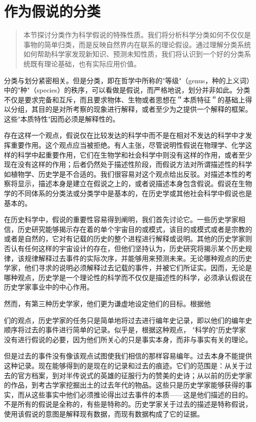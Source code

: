 \section{作为假说的分类}

\begin{quotation}
本节探讨分类作为科学假说的特殊性质。我们将分析科学分类如何不仅仅是事物的简单归类，而是反映自然界内在联系的理论假设。通过理解分类系统如何帮助科学家发现新知识、预测未知性质，我们将认识到一个好的分类系统既有理论基础，也有实际应用价值。
\end{quotation}

分类与划分紧密相关。但是分类，即在哲学中所称的"等级"（genus，种的上义词）中的"种"（species）的秩序，可以看做是假说，而严格地说，划分并非如此。分类不仅是要求完备和互斥，而且要求物体、生物或者思想在＂本质特征＂的基础上得以分组，其目的是对所考察的现象进行解释，或者至少为之提供一个解释的框架。这些"本质特性"因而必须是解释性的。

存在这样一个观点，假说仅在比较发达的科学中而不是在相对不发达的科学中才发挥重要作用。这个观点应当被拒绝。有人主张，尽管说明性假说在物理学、化学这样的科学中起重要作用，它们在生物学和社会科学中则没有这样的作用，或者至少现在没有这样的作用；后者仍然处于描述性阶段，而假说方法对所谓描述性的科学如植物学、历史学是不合适的。我们很容易对这个观点给出反驳。对描述本性的考察将显示，描述本身是建立在假说之上的，或者说描述本身包含假说。假说在生物学的不同体系的分类法或分类学中是基本的，在历史学或其他社会科学中假说也是基本的。

在历史科学中，假说的重要性容易得到阐明，我们首先讨论它。一些历史学家相信，历史研究能够揭示存在着的单个宇宙目的或模式，该目的或模式或者是宗教的或者是自然的，它对有记载的历史的整个进程进行解释或说明。其他的历史学家则否认有任何这样的宇宙设计的存在，但他们坚持认为，历史研究将揭示某个历史规律，该规律解释过去事件的实际次序，并能够用来预测未来。无论哪种观点的历史学家，他们寻求的说明必须解释过去记载的事件，并被它们所证实。因而，无论是哪种观点，历史学是一个理论性的科学而不仅仅是描述性的科学，必须承认假说在历史学家事业中的中心作用。

然而，有第三种历史学家，他们更为谦虚地设定他们的目标。根据他

们的观点，历史学家的任务只是简单地将过去进行编年史记录，即以他们的编年史顺序将过去的事件进行简单的记录。似乎是，根据这种观点， "科学的"历史学家没有进行假说的必要，因为他们所关心的只是事实本身，而非与事实有关的理论。

但是过去的事件没有像该观点试图使我们相信的那样容易编年。过去本身不能提供这种记录。现在能够得到的是现在的记录和过去的痕迹。它们的范围是：从关于过去的官方档案，到对半传说式的英雄的征服行为的赞美的史诗；从以前的历史学家的作品，到考古学家挖掘出土的过去年代的物品。这些只是历史学家能够获得的事实，而从这些事实中他们必须推论得出过去事件的本质——这是他们描述的目的。不是所有的假说是全称的，有些是特称的。历史学家关于过去的描述是特称假说，使用该假说的意图是解释现有数据，而现有数据构成了它的证据。

